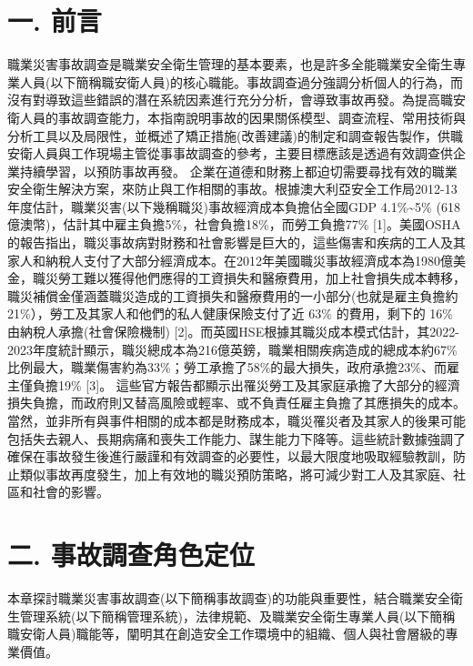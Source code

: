 \documentclass[
  letterpaper,
  DIV=11,
  numbers=noendperiod]{scrreprt}
\begin{document}
\section*{一. 前言}\label{ux4e00.-ux524dux8a00}


職業災害事故調查是職業安全衛生管理的基本要素，也是許多全能職業安全衛生專業人員(以下簡稱職安衛人員)的核心職能。事故調查過分強調分析個人的行為，而沒有對導致這些錯誤的潛在系統因素進行充分分析，會導致事故再發。為提高職安衛人員的事故調查能力，本指南說明事故的因果關係模型、調查流程、常用技術與分析工具以及局限性，並概述了矯正措施(改善建議)的制定和調查報告製作，供職安衛人員與工作現場主管從事事故調查的參考，主要目標應該是透過有效調查供企業持續學習，以預防事故再發。
企業在道德和財務上都迫切需要尋找有效的職業安全衛生解決方案，來防止與工作相關的事故。根據澳大利亞安全工作局2012-13年度估計，職業災害(以下幾稱職災)事故經濟成本負擔佔全國GDP
4.1\%\textasciitilde5\%
(618億澳幣)，估計其中雇主負擔5\%，社會負擔18\%，而勞工負擔77\%
{[}1{]}。美國OSHA的報告指出，職災事故病對財務和社會影響是巨大的，這些傷害和疾病的工人及其家人和納稅人支付了大部分經濟成本。在2012年美國職災事故經濟成本為1980億美金，職災勞工難以獲得他們應得的工資損失和醫療費用，加上社會損失成本轉移，職災補償金僅涵蓋職災造成的工資損失和醫療費用的一小部分(也就是雇主負擔約
21\%），勞工及其家人和他們的私人健康保險支付了近 63\% 的費用，剩下的
16\% 由納稅人承擔(社會保險機制)
{[}2{]}。而英國HSE根據其職災成本模式估計，其2022-2023年度統計顯示，職災總成本為216億英鎊，職業相關疾病造成的總成本約67\%比例最大，職業傷害約為33\%；勞工承擔了58\%的最大損失，政府承擔23\%、而雇主僅負擔19\%
{[}3{]}。
這些官方報告都顯示出罹災勞工及其家庭承擔了大部分的經濟損失負擔，而政府則又替高風險或輕率、或不負責任雇主負擔了其應損失的成本。當然，並非所有與事件相關的成本都是財務成本，職災罹災者及其家人的後果可能包括失去親人、長期病痛和喪失工作能力、謀生能力下降等。這些統計數據強調了確保在事故發生後進行嚴謹和有效調查的必要性，以最大限度地吸取經驗教訓，防止類似事故再度發生，加上有效地的職災預防策略，將可減少對工人及其家庭、社區和社會的影響。

\section*{二.
事故調查角色定位}\label{ux4e8c.-ux4e8bux6545ux8abfux67e5ux89d2ux8272ux5b9aux4f4d}


本章探討職業災害事故調查(以下簡稱事故調查)的功能與重要性，結合職業安全衛生管理系統(以下簡稱管理系統)，法律規範、及職業安全衛生專業人員(以下簡稱職安衛人員)職能等，闡明其在創造安全工作環境中的組織、個人與社會層級的專業價值。
\end{document}
